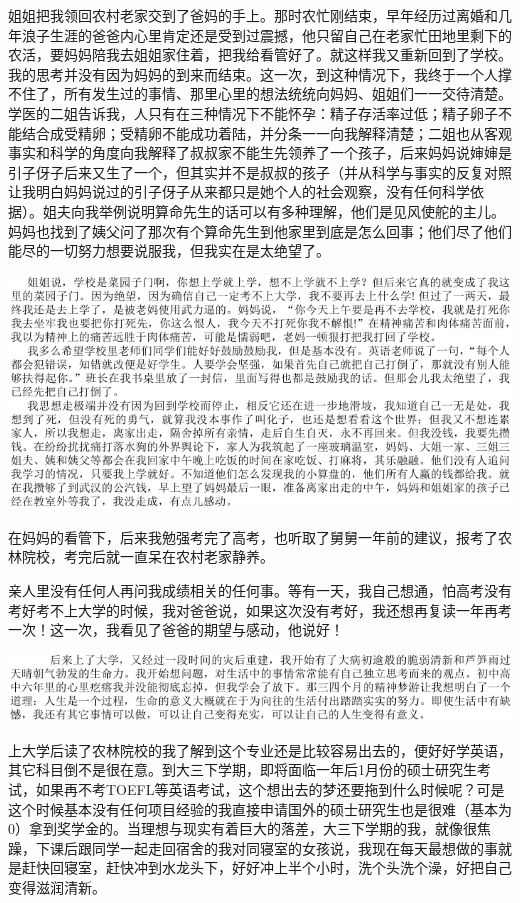 \documentclass[9pt, b5paper]{article}
\begin{document}
姐姐把我领回农村老家交到了爸妈的手上。那时农忙刚结束，早年经历过离婚和几年浪子生涯的爸爸内心里肯定还是受到过震撼，他只留自己在老家忙田地里剩下的农活，要妈妈陪我去姐姐家住着，把我给看管好了。就这样我又重新回到了学校。我的思考并没有因为妈妈的到来而结束。这一次，到这种情况下，我终于一个人撑不住了，所有发生过的事情、那里心里的想法统统向妈妈、姐姐们一一交待清楚。学医的二姐告诉我，人只有在三种情况下不能怀孕：精子存活率过低；精子卵子不能结合成受精卵；受精卵不能成功着陆，并分条一一向我解释清楚；二姐也从客观事实和科学的角度向我解释了叔叔家不能生先领养了一个孩子，后来妈妈说婶婶是引子伢子后来又生了一个，但其实并不是叔叔的孩子（并从科学与事实的反复对照让我明白妈妈说过的引子伢子从来都只是她个人的社会观察，没有任何科学依据）。姐夫向我举例说明算命先生的话可以有多种理解，他们是见风使舵的主儿。妈妈也找到了姨父问了那次有个算命先生到他家里到底是怎么回事；他们尽了他们能尽的一切努力想要说服我，但我实在是太绝望了。

\includegraphics[width=.9\linewidth]{./pic/p1p22-1.png}

在妈妈的看管下，后来我勉强考完了高考，也听取了舅舅一年前的建议，报考了农林院校，考完后就一直呆在农村老家静养。

亲人里没有任何人再问我成绩相关的任何事。等有一天，我自己想通，怕高考没有考好考不上大学的时候，我对爸爸说，如果这次没有考好，我还想再复读一年再考一次！这一次，我看见了爸爸的期望与感动，他说好！

\includegraphics[width=.9\linewidth]{./pic/p1p23.png}

上大学后读了农林院校的我了解到这个专业还是比较容易出去的，便好好学英语，其它科目倒不是很在意。到大三下学期，即将面临一年后1月份的硕士研究生考试，如果再不考TOEFL等英语考试，这个想出去的梦还要拖到什么时候呢？可是这个时候基本没有任何项目经验的我直接申请国外的硕士研究生也是很难（基本为0）拿到奖学金的。当理想与现实有着巨大的落差，大三下学期的我，就像很焦躁，下课后跟同学一起走回宿舍的我对同寝室的女孩说，我现在每天最想做的事就是赶快回寝室，赶快冲到水龙头下，好好冲上半个小时，洗个头洗个澡，好把自己变得滋润清新。
\end{document}
